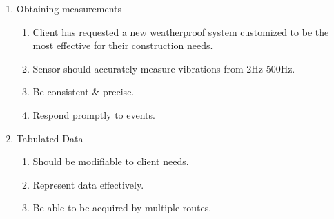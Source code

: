 \documentclass[12pt]{article}
\begin{document}
\begin{enumerate}
	\item Obtaining measurements
	\begin{enumerate}
		\item Client has requested a new weatherproof system customized to be the most effective for their construction needs.
		\item Sensor should accurately measure vibrations from 2Hz-500Hz.
		\item Be consistent \& precise.
		\item Respond promptly to events.
	\end{enumerate}
	
	\item Tabulated Data
	\begin{enumerate}
		\item Should be modifiable to client needs.
		\item Represent data effectively.
		\item Be able to be acquired by multiple routes.
	\end{enumerate}
	

\end{enumerate}
\end{document}
